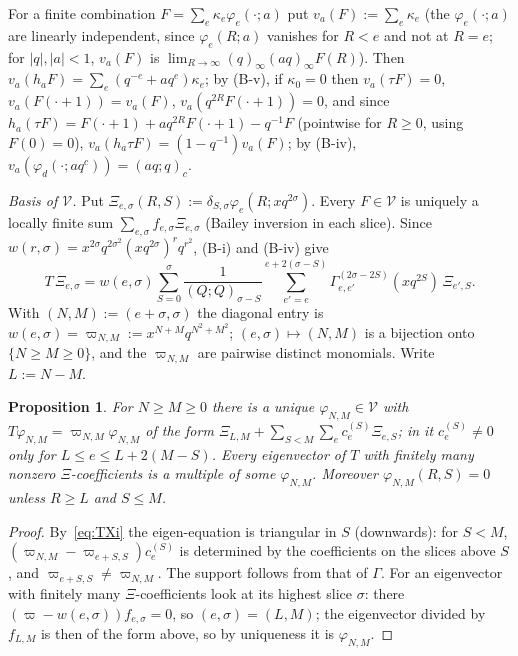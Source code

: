 \documentclass[11pt]{amsart}
\newtheorem{proposition}[theorem]{Proposition}
\theoremstyle{definition}
\numberwithin{equation}{section}
\begin{document}
For a finite combination $F=\sum_e\kappa_e\varphi_e(\cdot;a)$ put $v_a(F):=\sum_e\kappa_e$ (the $\varphi_e(\cdot;a)$ are
linearly independent, since $\varphi_e(R;a)$ vanishes for $R<e$ and not at $R=e$; for $|q|,|a|<1$, $v_a(F)$ is
$\lim_{R\to\infty}(q)_\infty(aq)_\infty F(R)$). Then $v_a(h_aF)=\sum_e(q^{-e}+aq^e)\kappa_e$; by (B-v), if
$\kappa_0=0$ then $v_a(\tau F)=0$, $v_a(F(\cdot+1))=v_a(F)$, $v_a(q^{2R}F(\cdot+1))=0$, and since
$h_a(\tau F)=F(\cdot+1)+aq^{2R}F(\cdot+1)-q^{-1}F$ (pointwise for $R\ge0$, using $F(0)=0$),
$v_a(h_a\tau F)=(1-q^{-1})v_a(F)$; by (B-iv), $v_a(\varphi_d(\cdot;aq^c))=(aq;q)_c$.

\emph{Basis of $\mathcal V$.} Put $\Xi_{e,\sigma}(R,S):=\delta_{S,\sigma}\varphi_e(R;xq^{2\sigma})$. Every $F\in\mathcal V$ is
uniquely a locally finite sum $\sum_{e,\sigma}f_{e,\sigma}\Xi_{e,\sigma}$ (Bailey inversion in each slice). Since
$w(r,\sigma)=x^{2\sigma}q^{2\sigma^2}(xq^{2\sigma})^rq^{r^2}$, (B-i) and (B-iv) give
\begin{equation}\label{eq:TXi}
T\,\Xi_{e,\sigma}=w(e,\sigma)\sum_{S=0}^{\sigma}\frac1{(Q;Q)_{\sigma-S}}\sum_{e'=e}^{e+2(\sigma-S)}\Gamma^{(2\sigma-2S)}_{e,e'}(xq^{2S})\,\Xi_{e',S}.
\end{equation}
With $(N,M):=(e+\sigma,\sigma)$ the diagonal entry is $w(e,\sigma)=\varpi_{N,M}:=x^{N+M}q^{N^2+M^2}$; $(e,\sigma)\mapsto(N,M)$
is a bijection onto $\{N\ge M\ge0\}$, and the $\varpi_{N,M}$ are pairwise distinct monomials. Write $L:=N-M$.

\begin{proposition}\label{prop:eig}
For $N\ge M\ge0$ there is a unique $\varphi_{N,M}\in\mathcal V$ with $T\varphi_{N,M}=\varpi_{N,M}\varphi_{N,M}$ of the
form $\Xi_{L,M}+\sum_{S<M}\sum_ec^{(S)}_e\Xi_{e,S}$; in it $c^{(S)}_e\ne0$ only for $L\le e\le L+2(M-S)$. Every
eigenvector of $T$ with finitely many nonzero $\Xi$-coefficients is a multiple of some $\varphi_{N,M}$. Moreover
$\varphi_{N,M}(R,S)=0$ unless $R\ge L$ and $S\le M$.
\end{proposition}
\begin{proof}
By~\eqref{eq:TXi} the eigen-equation is triangular in $S$ (downwards): for $S<M$,
$(\varpi_{N,M}-\varpi_{e+S,S})c^{(S)}_e$ is determined by the coefficients on the slices above $S$, and
$\varpi_{e+S,S}\ne\varpi_{N,M}$. The support follows from that of $\Gamma$. For an eigenvector with finitely many
$\Xi$-coefficients look at its highest slice $\sigma$: there $(\varpi-w(e,\sigma))f_{e,\sigma}=0$, so
$(e,\sigma)=(L,M)$; the eigenvector divided by $f_{L,M}$ is then of the form above, so by uniqueness it is $\varphi_{N,M}$.
\end{proof}
\end{document}
